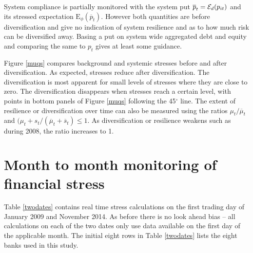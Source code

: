 \documentclass[12pt]{article}
\newcommand{\E}{\mathrm{E}}
\newcommand{\Ex}{{\cal E}}
\newcommand{\Exd}{\Ex_d}
\newcommand{\Es}{\E_\phi}
\newcommand{\fref}[1]{Figure \ref{#1}}
\newcommand{\tref}[1]{Table \ref{#1}}
\begin{document}
System compliance is partially monitored with the system put $\overline p_t=\Exd(p_{it})$ and its stressed expectation $\Es(\overline p_t)$. However both quantities are before diversification and give no indication of system resilience and as to how much risk can be diversified away. Basing a put on system wide aggregated debt and equity and comparing the same to $p_t$  gives at least some guidance.

\fref{muqs} compares background and systemic stresses before and after diversification. As expected, stresses reduce after diversification. The diversification is most apparent for small levels of stresses where they are close to zero. The diversification disappears when stresses reach a certain level, with points in bottom panels of \fref{muqs} following the 45$^\circ$ line. The extent of resilience or diversification over time can also be measured using the ratios $\mu_t/\overline \mu_t$ and $(\mu_t+s_t/(\overline \mu_t+\overline s_t)\le 1$. As diversification or resilience weakens such as during 2008, the ratio increases to 1.

\section{Month to month monitoring  of financial stress}\label{monitoring}
 \tref{twodates} contains real time stress calculations on the first trading day of  January 2009 and November 2014.  As before there is no look ahead bias -- all calculations on each of the two dates only use data available on the first day of the applicable month.   The initial eight rows in \tref{twodates} lists the eight banks used in this study. 
 
\end{document}
